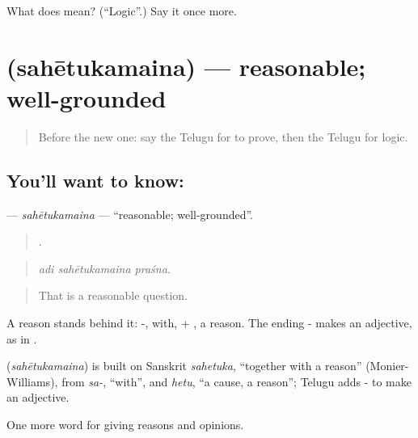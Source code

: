 \begin{tcolorbox}[breakable,colback=teal!4,colframe=teal!35!black,title={Before you move on}]
What does  mean? (\textquotedblleft{}Logic\textquotedblright{}.) Say it once more.
\end{tcolorbox}
\section[\texorpdfstring{\te{సహేతుకమైన} (sahētukamaina)}{సహేతుకమైన (sahētukamaina)}]{ (sahētukamaina) — reasonable; well-grounded}

\label{lesson:TE-C383-sahetukamaina}



\begin{quote}
Before the new one: say the Telugu for to prove, then the Telugu for logic.
\end{quote}

\subsection*{You'll want to know: }
\textbf{} — \emph{sahētukamaina} — \textquotedblleft{}reasonable; well-grounded\textquotedblright{}.

\begin{quote}
  .
\end{quote}

\begin{quote}
\emph{adi sahētukamaina praśna.}
\end{quote}

\begin{quote}
That is a reasonable question.
\end{quote}

A reason stands behind it: -, with, + , a reason. The ending - makes an adjective, as in .

\begin{cousinweb}
\textbf{} (\emph{sahētukamaina}) is built on Sanskrit \emph{sahetuka}, \textquotedblleft{}together with a reason\textquotedblright{} (Monier-Williams), from \emph{sa-}, \textquotedblleft{}with\textquotedblright{}, and \emph{hetu}, \textquotedblleft{}a cause, a reason\textquotedblright{}; Telugu adds - to make an adjective.
\end{cousinweb}

\begin{grammarlens}[title={What you've built}]
One more word for giving reasons and opinions.
\end{grammarlens}

